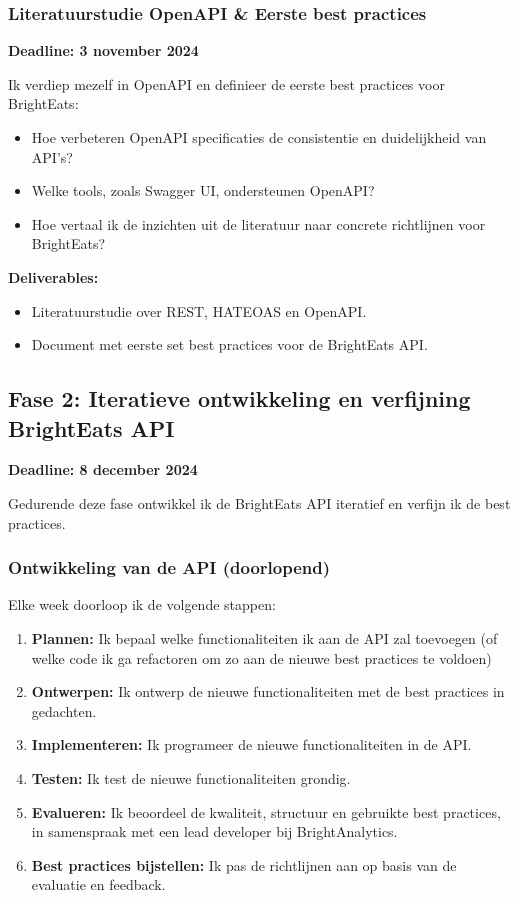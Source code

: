 \subsubsection{Literatuurstudie OpenAPI \& Eerste best practices}

\textbf{Deadline: 3 november 2024}

\bigskip
Ik verdiep mezelf in OpenAPI en definieer de eerste best practices voor BrightEats:

\begin{itemize}
  \item Hoe verbeteren OpenAPI specificaties de consistentie en duidelijkheid van API's?
  \item Welke tools, zoals Swagger UI, ondersteunen OpenAPI?
  \item Hoe vertaal ik de inzichten uit de literatuur naar concrete richtlijnen voor BrightEats?
\end{itemize}

\textbf{Deliverables:}

\begin{itemize}
  \item Literatuurstudie over REST, HATEOAS en OpenAPI.
  \item Document met eerste set best practices voor de BrightEats API.
\end{itemize}

\subsection{Fase 2: Iteratieve ontwikkeling en verfijning BrightEats API}

\textbf{Deadline: 8 december 2024}

\bigskip
Gedurende deze fase ontwikkel ik de BrightEats API iteratief en verfijn ik de best practices.

\subsubsection{Ontwikkeling van de API (doorlopend)}

\bigskip
Elke week doorloop ik de volgende stappen:

\begin{enumerate}
  \item \textbf{Plannen:} Ik bepaal welke functionaliteiten ik aan de API zal toevoegen (of welke code ik ga refactoren om zo aan de nieuwe best practices te voldoen)
  \item \textbf{Ontwerpen:} Ik ontwerp de nieuwe functionaliteiten met de best practices in gedachten.
  \item \textbf{Implementeren:} Ik programeer de nieuwe functionaliteiten in de API.
  \item \textbf{Testen:} Ik test de nieuwe functionaliteiten grondig.
  \item \textbf{Evalueren:} Ik beoordeel de kwaliteit, structuur en gebruikte best practices, in samenspraak met een lead developer bij BrightAnalytics.
  \item \textbf{Best practices bijstellen:} Ik pas de richtlijnen aan op basis van de evaluatie en feedback.
\end{enumerate}

